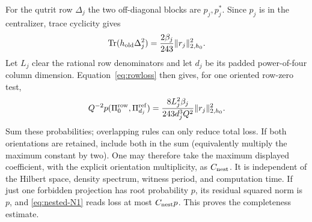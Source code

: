 For the qutrit row $\Delta_j$ the two off-diagonal blocks are $p_j,p_j^*$.
Since $p_j$ is in the centralizer, trace cyclicity gives
\[
 \operatorname{Tr}(h_{\rm old}\Delta_j^2)=\frac{2\beta_j}{243}\|r_j\|_{2,h_0}^2.
\]
Let $L_j$ clear the rational row denominators and let $d_j$ be its
padded power-of-four column dimension. Equation~\eqref{eq:rowloss}
then gives, for one oriented row-zero test,
\begin{equation}
 Q^{-2}p(\Pi^{\rm row}_0,\Pi^{\rm ref}_{d_j})=
 \frac{8L_j^2\beta_j}{243d_j^3Q^2}\|r_j\|_{2,h_0}^2.
                                                               \label{eq:nested-N11}
\end{equation}
Sum these probabilities; overlapping rules can only reduce total loss.
If both orientations are retained, include both in the sum (equivalently
multiply the maximum constant by two). One may therefore take the
maximum displayed coefficient, with the explicit orientation
multiplicity, as $C_{\rm nest}$. It is independent of the Hilbert space,
density spectrum, witness period, and computation time. If just one
forbidden projection has root probability $p$, its residual squared norm
is $p$, and \eqref{eq:nested-N1} reads loss at most $C_{\rm nest}p$. This proves the
completeness estimate.

